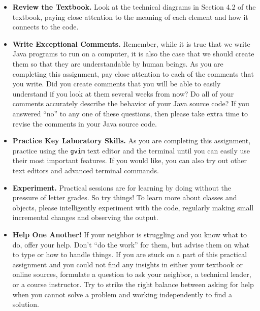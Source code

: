 \documentclass[11pt]{article}
\begin{document}
\vspace*{-.05in}
\begin{itemize}

\item {\bf Review the Textbook.} Look at the technical diagrams in Section 4.2
  of the textbook, paying close attention to the meaning of each element and how
  it connects to the code.

\item {\bf Write Exceptional Comments.} Remember, while it is true that we write
  Java programs to run on a computer, it is also the case that we should create
  them so that they are understandable by human beings. As you are completing
  this assignment, pay close attention to each of the comments that you write.
  Did you create comments that you will be able to easily understand if you look
  at them several weeks from now? Do all of your comments accurately describe
  the behavior of your Java source code? If you answered ``no'' to any one of
  these questions, then please take extra time to revise the comments in your
  Java source code.

\item {\bf Practice Key Laboratory Skills.} As you are completing this
  assignment, practice using the {\tt gvim} text editor and the terminal until
  you can easily use their most important features. If you would like, you can
  also try out other text editors and advanced terminal commands.

\item {\bf Experiment.} Practical sessions are for learning by doing without the
  pressure of letter grades. So try things! To learn more about classes and
  objects, please intelligently experiment with the code, regularly making small
  incremental changes and observing the output.

\item {\bf Help One Another!} If your neighbor is struggling and you know what
  to do, offer your help. Don't ``do the work'' for them, but advise them on
  what to type or how to handle things. If you are stuck on a part of this
  practical assignment and you could not find any insights in either your
  textbook or online sources, formulate a question to ask your neighbor, a
  technical leader, or a course instructor. Try to strike the right balance
  between asking for help when you cannot solve a problem and working
  independently to find a solution.

\end{itemize}
\end{document}
